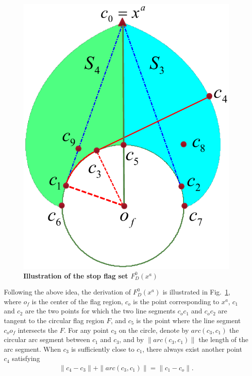 \begin{figure}[tbp]
	\centering
	\includegraphics[width=0.65\columnwidth]{figures/FD0}
	\caption{\textbf{Illustration of the stop flag set $F_D^0(x^a)$}}
	\label{fig:FD0}
\end{figure}
Following the above idea, the derivation of $F_D^0(x^a)$ is illustrated in Fig.~\ref{fig:FD0}, where $o_f$ is the center of the flag region, $c_o$ is the point corresponding to $x^a$, $c_1$ and $c_2$ are the two points for which the two line segments $c_oc_1$ and $c_oc_2$ are tangent to the circular flag region $F$, and $c_5$ is the point where the line segment $c_oo_f$ intersects the $F$. For any point $c_3$ on the circle, denote by $arc(c_3,c_1)$ the circular arc segment between $c_1$ and $c_3$, and by $\|arc(c_3,c_1)\|$ the length of the arc segment. When $c_3$ is sufficiently close to $c_1$, there always exist another point $c_4$ satisfying
\begin{align*}
\|c_4 - c_3\|+\|arc(c_3,c_1)\| = \|c_1-c_o\|. 
\end{align*}

